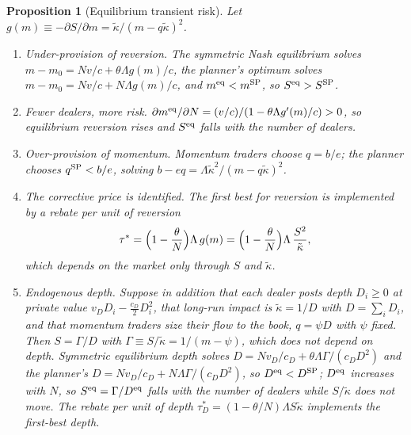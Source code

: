 \documentclass[12pt]{article}
\newtheorem{proposition}[theorem]{Proposition}
\theoremstyle{definition}
\theoremstyle{remark}
\begin{document}
\begin{proposition}[Equilibrium transient risk]\label{prop:equil}
Let $g(m)\equiv-\partial S/\partial m=\tilde\kappa/(m-q\tilde\kappa)^2$.
\begin{enumerate}[label=(\roman*)]
\item \emph{Under-provision of reversion.} The symmetric Nash equilibrium solves $m-m_0=N v/c+\theta\Lambda g(m)/c$, the planner's optimum solves $m-m_0=N v/c+N\Lambda g(m)/c$, and $m^{\rm eq}<m^{\rm SP}$, so $S^{\rm eq}>S^{\rm SP}$.
\item \emph{Fewer dealers, more risk.} $\partial m^{\rm eq}/\partial N=(v/c)/(1-\theta\Lambda g'(m)/c)>0$, so equilibrium reversion rises and $S^{\rm eq}$ falls with the number of dealers.
\item \emph{Over-provision of momentum.} Momentum traders choose $q=b/e$; the planner chooses $q^{\rm SP}<b/e$, solving $b-eq=\Lambda\tilde\kappa^2/(m-q\tilde\kappa)^2$.
\item \emph{The corrective price is identified.} The first best for reversion is implemented by a rebate per unit of reversion
\[
\tau^*=\Bigl(1-\frac\theta N\Bigr)\Lambda\,g(m)=\Bigl(1-\frac\theta N\Bigr)\Lambda\,\frac{S^2}{\tilde\kappa},
\]
which depends on the market only through $S$ and $\tilde\kappa$.
\item \emph{Endogenous depth.} Suppose in addition that each dealer posts depth $D_i\ge0$ at private value $v_DD_i-\tfrac{c_D}2D_i^2$, that long-run impact is $\tilde\kappa=1/D$ with $D=\sum_iD_i$, and that momentum traders size their flow to the book, $q=\psi D$ with $\psi$ fixed. Then $S=\Gamma/D$ with $\Gamma\equiv S/\tilde\kappa=1/(m-\psi)$, which does not depend on depth. Symmetric equilibrium depth solves $D=Nv_D/c_D+\theta\Lambda\Gamma/(c_DD^2)$ and the planner's $D=Nv_D/c_D+N\Lambda\Gamma/(c_DD^2)$, so $D^{\rm eq}<D^{\rm SP}$; $D^{\rm eq}$ increases with $N$, so $S^{\rm eq}=\Gamma/D^{\rm eq}$ falls with the number of dealers while $S/\tilde\kappa$ does not move. The rebate per unit of depth $\tau_D^*=(1-\theta/N)\Lambda S\tilde\kappa$ implements the first-best depth.
\end{enumerate}
\end{proposition}
\end{document}
